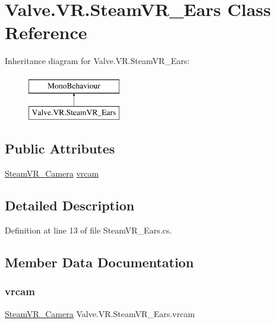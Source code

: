 \hypertarget{class_valve_1_1_v_r_1_1_steam_v_r___ears}{}\section{Valve.\+V\+R.\+Steam\+V\+R\+\_\+\+Ears Class Reference}
\label{class_valve_1_1_v_r_1_1_steam_v_r___ears}
Inheritance diagram for Valve.\+V\+R.\+Steam\+V\+R\+\_\+\+Ears\+:\begin{figure}[H]
\begin{center}
\leavevmode
\includegraphics[height=2.000000cm]{class_valve_1_1_v_r_1_1_steam_v_r___ears}
\end{center}
\end{figure}
\subsection*{Public Attributes}
\begin{DoxyCompactItemize}
\item 
\mbox{\hyperlink{class_valve_1_1_v_r_1_1_steam_v_r___camera}{Steam\+V\+R\+\_\+\+Camera}} \mbox{\hyperlink{class_valve_1_1_v_r_1_1_steam_v_r___ears_a6afe27ca31f0cdf1c25055ccc6c5e26f}{vrcam}}
\end{DoxyCompactItemize}


\subsection{Detailed Description}


Definition at line 13 of file Steam\+V\+R\+\_\+\+Ears.\+cs.



\subsection{Member Data Documentation}
\mbox{\label{class_valve_1_1_v_r_1_1_steam_v_r___ears_a6afe27ca31f0cdf1c25055ccc6c5e26f}} 
\subsubsection{\texorpdfstring{vrcam}{vrcam}}
{\footnotesize\ttfamily \mbox{\hyperlink{class_valve_1_1_v_r_1_1_steam_v_r___camera}{Steam\+V\+R\+\_\+\+Camera}} Valve.\+V\+R.\+Steam\+V\+R\+\_\+\+Ears.\+vrcam}



